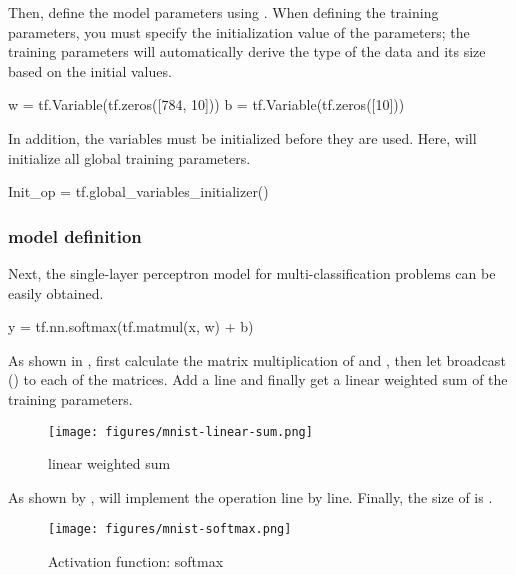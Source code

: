 \begin{content}
\begin{content}
Then, define the model parameters using . When defining the training parameters, you must specify the initialization value of the parameters; the training parameters will automatically derive the type of the data and its size based on the initial values.

\begin{leftbar}
\begin{python}
w = tf.Variable(tf.zeros([784, 10]))
b = tf.Variable(tf.zeros([10]))
\end{python}
\end{leftbar}

In addition, the variables must be initialized before they are used. Here,  will initialize all global training parameters.

\begin{leftbar}
\begin{python}
Init_op = tf.global_variables_initializer()
\end{python}
\end{leftbar}

\subsubsection{model definition}

Next, the single-layer perceptron model for multi-classification problems can be easily obtained.

\begin{leftbar}
\begin{python}
y = tf.nn.softmax(tf.matmul(x, w) + b)
\end{python}
\end{leftbar}

As shown in , first calculate the matrix multiplication of  and , then let  broadcast () to each of the matrices. Add a line and finally get a linear weighted sum of the training parameters.

\begin{figure}[H]
\centering
\texttt{[image: figures/mnist-linear-sum.png]}
\caption{linear weighted sum}
 \label{fig:mnist-linear-sum}
\end{figure}

As shown by ,  will implement the operation line by line. Finally, the size of  is \code{[100, 10]}.

\begin{figure}[H]
\centering
\texttt{[image: figures/mnist-softmax.png]}
\caption{Activation function: softmax}
 \label{fig:mnist-softmax}
\end{figure}


\end{content}
\end{content}
